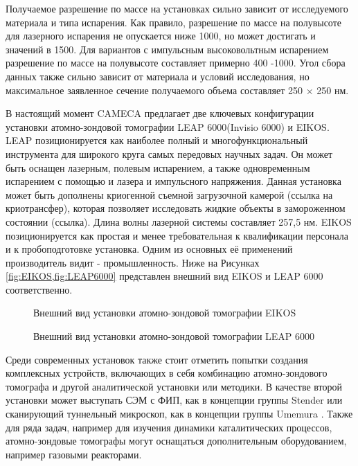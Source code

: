 Получаемое разрешение по массе на установках сильно зависит от исследуемого материала и типа испарения. Как правило, разрешение по массе на полувысоте для лазерного испарения не опускается ниже 1000, но может достигать и значений в 1500. Для вариантов с импульсным высоковольтным  испарением разрешение по массе на полувысоте составляет примерно 400 -1000. Угол сбора данных также сильно зависит от материала и условий исследования, но максимальное заявленное сечение получаемого объема составляет 250 × 250 нм.

В настоящий момент CAMECA предлагает две ключевых конфигурации установки атомно-зондовой томографии LEAP 6000(Invisio 6000) и EIKOS. LEAP позиционируется как наиболее полный и многофункциональный инструмента для широкого круга самых передовых научных задач. Он может быть оснащен лазерным, полевым испарением, а также одновременным испарением с помощью и лазера и импульсного напряжения. Данная установка может быть дополнены криогенной съемной загрузочной камерой (ссылка на криотрансфер), которая позволяет исследовать жидкие объекты в замороженном состоянии (ссылка). Длина волны лазерной системы составляет 257,5 нм. EIKOS  позиционируется как простая и менее требовательная к квалификации персонала и к пробоподготовке установка. Одним из основных её применений производитель видит - промышленность. Ниже на Рисунках \cref{fig:EIKOS,fig:LEAP6000} представлен внешний вид EIKOS и LEAP 6000 соответственно.

\begin{figure}[htb]
	\caption{Внешний вид установки атомно-зондовой томографии EIKOS}
	\label{fig:EIKOS}
\end{figure}

\begin{figure}[htb]
	\caption{Внешний вид установки атомно-зондовой томографии LEAP 6000}
	\label{fig:LEAP6000}
\end{figure}

\FloatBarrier

Среди современных установок также стоит отметить попытки создания комплексных устройств, включающих в себя комбинацию атомно-зондового томографа и другой аналитической установки или методики. В качестве второй установки может выступать СЭМ с ФИП, как в концепции группы Stender \cite{Stender22} или сканирующий туннельный микроскоп, как в концепции группы Umemura \cite{Umemura19}. Также для ряда задач, например для изучения динамики каталитических процессов, атомно-зондовые томографы могут оснащаться дополнительным оборудованием, например газовыми реакторами\cite{Lambeets20}.

